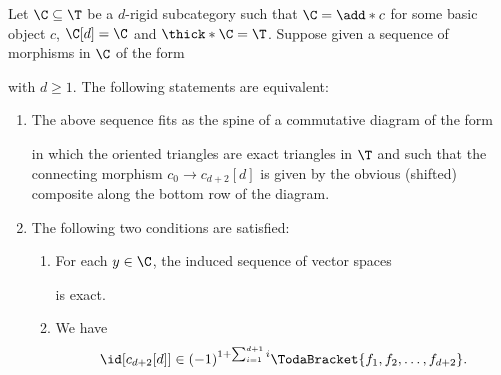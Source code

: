 \documentclass[a4paper]{amsart}
\begin{document}
\begin{theorem}
  \label{thm:TodaBracket_d+2-angles}
  Let $\C\subseteq\T$ be a $d$-rigid subcategory such that ${\C=\add*{c}}$ for some basic object $c$,
  ${\C[d]=\C}$ and $\thick*{\C}=\T$. Suppose given a sequence of morphisms in $\C$
  of the form
  \begin{center}
  \end{center}
  with $d\geq1$. The following statements are equivalent:
  \begin{enumerate}
  \item\label{it:TodaBracket_d+2-angles_isstd} The above sequence fits as the
    spine of a commutative diagram of the form
    \begin{center}
    \end{center}
    in which the oriented triangles are exact triangles in $\T$ and such that
    the connecting morphism $c_0\to c_{d+2}[d]$ is given by the obvious
    (shifted) composite along the bottom row of the diagram.
  \item\label{it:TodaBracket_d+2-angles_isAL} The following two conditions are
    satisfied:
    \begin{enumerate}
    \item For each $y\in\C$, the induced sequence of vector spaces
      \begin{center}\vspace{-1em}
      \end{center}
      is exact.
    \item We have
      \[
        \id[c_{d+2}[d]]\in(-1)^{1+\sum_{i=1}^{d+1}i}\TodaBracket{f_1,f_2,\dots,f_{d+2}}.
      \]
    \end{enumerate}
  \end{enumerate}
\end{theorem}
\end{document}
